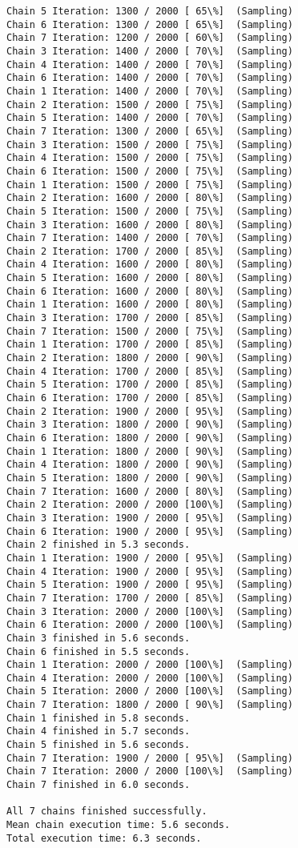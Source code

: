 \documentclass[11pt]{article}
\begin{document}
\begin{Verbatim}[commandchars=\\\{\}]
Chain 5 Iteration: 1300 / 2000 [ 65\%]  (Sampling)
Chain 6 Iteration: 1300 / 2000 [ 65\%]  (Sampling)
Chain 7 Iteration: 1200 / 2000 [ 60\%]  (Sampling)
Chain 3 Iteration: 1400 / 2000 [ 70\%]  (Sampling)
Chain 4 Iteration: 1400 / 2000 [ 70\%]  (Sampling)
Chain 6 Iteration: 1400 / 2000 [ 70\%]  (Sampling)
Chain 1 Iteration: 1400 / 2000 [ 70\%]  (Sampling)
Chain 2 Iteration: 1500 / 2000 [ 75\%]  (Sampling)
Chain 5 Iteration: 1400 / 2000 [ 70\%]  (Sampling)
Chain 7 Iteration: 1300 / 2000 [ 65\%]  (Sampling)
Chain 3 Iteration: 1500 / 2000 [ 75\%]  (Sampling)
Chain 4 Iteration: 1500 / 2000 [ 75\%]  (Sampling)
Chain 6 Iteration: 1500 / 2000 [ 75\%]  (Sampling)
Chain 1 Iteration: 1500 / 2000 [ 75\%]  (Sampling)
Chain 2 Iteration: 1600 / 2000 [ 80\%]  (Sampling)
Chain 5 Iteration: 1500 / 2000 [ 75\%]  (Sampling)
Chain 3 Iteration: 1600 / 2000 [ 80\%]  (Sampling)
Chain 7 Iteration: 1400 / 2000 [ 70\%]  (Sampling)
Chain 2 Iteration: 1700 / 2000 [ 85\%]  (Sampling)
Chain 4 Iteration: 1600 / 2000 [ 80\%]  (Sampling)
Chain 5 Iteration: 1600 / 2000 [ 80\%]  (Sampling)
Chain 6 Iteration: 1600 / 2000 [ 80\%]  (Sampling)
Chain 1 Iteration: 1600 / 2000 [ 80\%]  (Sampling)
Chain 3 Iteration: 1700 / 2000 [ 85\%]  (Sampling)
Chain 7 Iteration: 1500 / 2000 [ 75\%]  (Sampling)
Chain 1 Iteration: 1700 / 2000 [ 85\%]  (Sampling)
Chain 2 Iteration: 1800 / 2000 [ 90\%]  (Sampling)
Chain 4 Iteration: 1700 / 2000 [ 85\%]  (Sampling)
Chain 5 Iteration: 1700 / 2000 [ 85\%]  (Sampling)
Chain 6 Iteration: 1700 / 2000 [ 85\%]  (Sampling)
Chain 2 Iteration: 1900 / 2000 [ 95\%]  (Sampling)
Chain 3 Iteration: 1800 / 2000 [ 90\%]  (Sampling)
Chain 6 Iteration: 1800 / 2000 [ 90\%]  (Sampling)
Chain 1 Iteration: 1800 / 2000 [ 90\%]  (Sampling)
Chain 4 Iteration: 1800 / 2000 [ 90\%]  (Sampling)
Chain 5 Iteration: 1800 / 2000 [ 90\%]  (Sampling)
Chain 7 Iteration: 1600 / 2000 [ 80\%]  (Sampling)
Chain 2 Iteration: 2000 / 2000 [100\%]  (Sampling)
Chain 3 Iteration: 1900 / 2000 [ 95\%]  (Sampling)
Chain 6 Iteration: 1900 / 2000 [ 95\%]  (Sampling)
Chain 2 finished in 5.3 seconds.
Chain 1 Iteration: 1900 / 2000 [ 95\%]  (Sampling)
Chain 4 Iteration: 1900 / 2000 [ 95\%]  (Sampling)
Chain 5 Iteration: 1900 / 2000 [ 95\%]  (Sampling)
Chain 7 Iteration: 1700 / 2000 [ 85\%]  (Sampling)
Chain 3 Iteration: 2000 / 2000 [100\%]  (Sampling)
Chain 6 Iteration: 2000 / 2000 [100\%]  (Sampling)
Chain 3 finished in 5.6 seconds.
Chain 6 finished in 5.5 seconds.
Chain 1 Iteration: 2000 / 2000 [100\%]  (Sampling)
Chain 4 Iteration: 2000 / 2000 [100\%]  (Sampling)
Chain 5 Iteration: 2000 / 2000 [100\%]  (Sampling)
Chain 7 Iteration: 1800 / 2000 [ 90\%]  (Sampling)
Chain 1 finished in 5.8 seconds.
Chain 4 finished in 5.7 seconds.
Chain 5 finished in 5.6 seconds.
Chain 7 Iteration: 1900 / 2000 [ 95\%]  (Sampling)
Chain 7 Iteration: 2000 / 2000 [100\%]  (Sampling)
Chain 7 finished in 6.0 seconds.

All 7 chains finished successfully.
Mean chain execution time: 5.6 seconds.
Total execution time: 6.3 seconds.

    \end{Verbatim}
\end{document}
